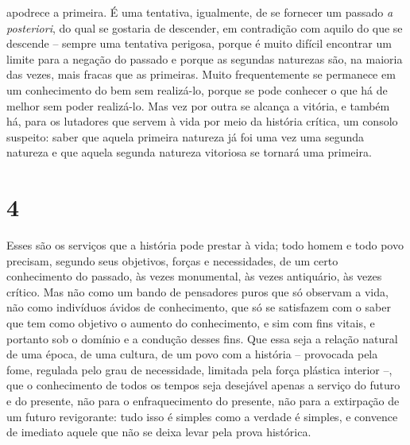 apodrece a primeira. É uma tentativa, igualmente, de se fornecer um
passado \emph{a posteriori}, do qual se gostaria de descender, em
contradição com aquilo do que se descende -- sempre uma tentativa
perigosa, porque é muito difícil encontrar um limite para a negação do
passado e porque as segundas naturezas são, na maioria das vezes, mais
fracas que as primeiras. Muito frequentemente se permanece em um
conhecimento do bem sem realizá-lo, porque se pode conhecer o que há de
melhor sem poder realizá-lo. Mas vez por outra se alcança a vitória, e
também há, para os lutadores que servem à vida por meio da história
crítica, um consolo suspeito: saber que aquela primeira natureza já foi
uma vez uma segunda natureza e que aquela segunda natureza vitoriosa se
tornará uma primeira.

  \chapter{4}\label{capuxedtulo-4}

    Esses são os serviços que a história pode prestar à vida; todo homem
    e todo povo precisam, segundo seus objetivos, forças e necessidades,
    de um certo conhecimento do passado, às vezes monumental, às vezes
    antiquário, às vezes crítico. Mas não como um bando de pensadores
    puros que só observam a vida, não como indivíduos ávidos de
    conhecimento, que só se satisfazem com o saber que tem como objetivo
    o aumento do conhecimento, e sim com fins vitais, e portanto sob o
    domínio e a condução desses fins. Que essa seja a relação natural de
    uma época, de uma cultura, de um povo com a história -- provocada
    pela fome, regulada pelo grau de necessidade, limitada pela força
    plástica interior --, que o conhecimento de todos os tempos seja
    desejável apenas a serviço do futuro e do presente, não para o
    enfraquecimento do presente, não para a extirpação de um futuro
    revigorante: tudo isso é simples como a verdade é simples, e
    convence de imediato aquele que não se deixa levar pela prova
    histórica.

